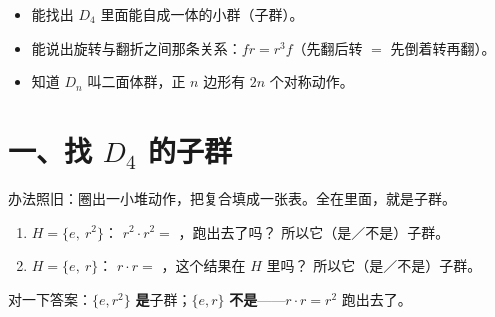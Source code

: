 

\begin{mubiao}
  \begin{itemize}
    \item 能找出 \(D_4\) 里面能自成一体的小群（子群）。
    \item 能说出旋转与翻折之间那条关系：\(fr=r^3f\)（先翻后转 \(=\) 先倒着转再翻）。
    \item 知道 \(D_n\) 叫二面体群，正 \(n\) 边形有 \(2n\) 个对称动作。
  \end{itemize}
\end{mubiao}

\section*{一、找 \(D_4\) 的子群}

\noindent 办法照旧：圈出一小堆动作，把复合填成一张表。全在里面，就是子群。

\begin{dongshou}[先检查两个]
  \begin{enumerate}
    \item \(H=\{e,\ r^2\}\)：
      \(r^2\cdot r^2=\) \underline{\hspace{2em}}，跑出去了吗？\underline{\hspace{3em}}
      \quad 所以它\underline{\hspace{2em}}（是／不是）子群。
    \item \(H=\{e,\ r\}\)：
      \(r\cdot r=\) \underline{\hspace{2em}}，这个结果在 \(H\) 里吗？\underline{\hspace{3em}}
      \quad 所以它\underline{\hspace{2em}}（是／不是）子群。
  \end{enumerate}
  对一下答案：\(\{e,r^2\}\) \textbf{是}子群；\(\{e,r\}\) \textbf{不是}——\(r\cdot r=r^2\) 跑出去了。
\end{dongshou}

